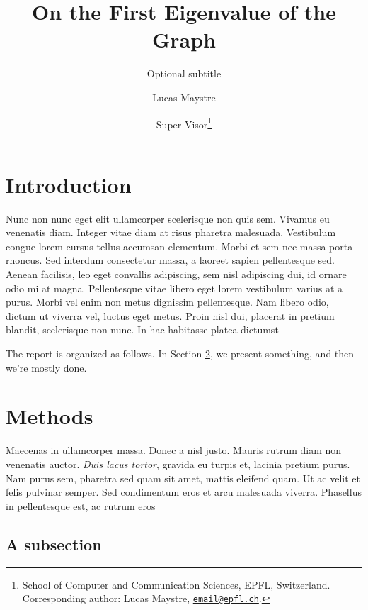 \documentclass[12pt,a4paper,oneside]{paper} %
\title{On the First Eigenvalue of the Graph}
\subtitle{Optional subtitle}
\author{Lucas Maystre \and Super Visor\thanks{School of Computer and
Communication Sciences, EPFL, Switzerland. Corresponding author: Lucas Maystre,
\href{mailto:email@epfl.ch}{\nolinkurl{email@epfl.ch}}.}}
\begin{document}
\maketitle



\section{Introduction} %
\label{sec:intro}

Nunc non nunc eget elit ullamcorper scelerisque non quis sem. Vivamus eu
venenatis diam. Integer vitae diam at risus pharetra malesuada. Vestibulum
congue lorem cursus tellus accumsan elementum. Morbi et sem nec massa porta
rhoncus. Sed interdum \citep{lecun2004learning} consectetur massa, a laoreet
sapien pellentesque sed.  Aenean facilisis, leo eget convallis adipiscing, sem
nisl adipiscing dui, id ornare odio mi at magna. Pellentesque vitae libero eget
lorem vestibulum varius at a purus. Morbi vel enim non metus dignissim
pellentesque. Nam libero odio, dictum ut viverra vel, luctus eget metus. Proin
nisl dui, placerat in pretium blandit, scelerisque non nunc. In hac habitasse
platea dictumst

The report is organized as follows. In Section \ref{sec:methods}, we present
something, and then we're mostly done.


\section{Methods} %
\label{sec:methods}

Maecenas in ullamcorper massa. Donec a nisl justo. Mauris rutrum diam non
venenatis auctor. \emph{Duis lacus tortor}, gravida eu turpis et, lacinia
pretium purus. Nam purus sem, pharetra sed quam sit amet, mattis eleifend quam.
Ut ac velit et felis pulvinar semper. Sed condimentum eros et arcu malesuada
viverra.  Phasellus in pellentesque est, ac rutrum eros

\subsection{A subsection}
\end{document}
